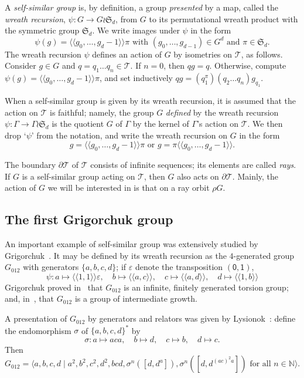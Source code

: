 \documentclass{amsart}
\newcommand\N{\mathbb{N}}
\newcommand\Grig{{G_{012}}}
\def\pair<#1>{{\langle\!\langle}#1{\rangle\!\rangle}}
\theoremstyle{definition}
\begin{document}
A \emph{self-similar group} is, by definition, a group
\emph{presented} by a map, called the \emph{wreath recursion},
$\psi:G\to G\wr\mathfrak S_d$, from $G$ to its permutational wreath
product with the symmetric group $\mathfrak S_d$. We write images
under $\psi$ in the form
\[\psi(g)=\pair<g_0,\dots,g_{d-1}>\pi\text{ with }(g_0,\dots,g_{d-1})\in G^d\text{ and }\pi\in\mathfrak S_d.\]
The wreath recursion $\psi$ defines an action of $G$ by isometries on
$\mathcal T$, as follows. Consider $g\in G$ and $q=q_1\dots
q_n\in\mathcal T$. If $n=0$, then $qg=q$. Otherwise, compute
$\psi(g)=\pair<g_0,\dots,g_{d-1}>\pi$, and set inductively $qg=(q_1^\pi)(q_2\dots q_n)g_{q_1}$.

When a self-similar group is given by its wreath recursion, it is
assumed that the action on $\mathcal T$ is faithful; namely, the group
$G$ \emph{defined} by the wreath recursion
$\psi:\Gamma\to\Gamma\wr\mathfrak S_d$ is the quotient $G$ of $\Gamma$
by the kernel of $\Gamma$'s action on $\mathcal T$.  We then drop
`$\psi$' from the notation, and write the wreath recursion on $G$ in
the form
\[g=\pair<g_0,\dots,g_{d-1}>\pi\text{ or }g=\pi\pair<g_0,\dots,g_{d-1}>.\]

The boundary $\partial\mathcal T$ of $\mathcal T$ consists of infinite
sequences; its elements are called \emph{rays}. If $G$ is a
self-similar group acting on $\mathcal T$, then $G$ also acts on
$\partial\mathcal T$. Mainly, the action of $G$ we will be interested
in is that on a ray orbit $\rho G$.

\subsection{The first Grigorchuk group}
An important example of self-similar group was extensively studied by
Grigorchuk~\cite{grigorchuk:(un)solved}. It may be defined by its
wreath recursion as the $4$-generated group $\Grig$ with generators
$\{a,b,c,d\}$; if $\varepsilon$ denote the transposition
$(\mathsf0,\mathsf1)$,
\begin{equation}\label{eqgrig}
\psi:a\mapsto\pair<1,1>\varepsilon,\quad b\mapsto\pair<a,c>,\quad
c\mapsto\pair<a,d>,\quad d\mapsto\pair<1,b>
\end{equation}
Grigorchuk proved in~\cite{grigorchuk:burnside} that $\Grig$ is an
infinite, finitely generated torsion group; and,
in~\cite{grigorchuk:growth}, that $\Grig$ is a group of intermediate
growth.

A presentation of $\Grig$ by generators and relators was given by
Lysionok~\cite{lysionok:pres}: define the endomorphism $\sigma$ of
$\{a,b,c,d\}^*$ by
\begin{equation}\label{eq:sigma}
  \sigma:a\mapsto aca,\quad b\mapsto d,\quad c\mapsto b,\quad d\mapsto c.
\end{equation}
Then
\begin{equation}\label{eq:lysionok}
\Grig=\langle a,b,c,d\mid a^2,b^2,c^2,d^2,bcd,\sigma^n([d,d^a]),\sigma^n([d,d^{(ac)^2a}])\text{ for all }n\in\N\rangle.
\end{equation}
\end{document}
